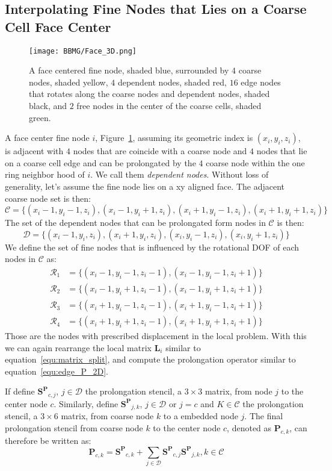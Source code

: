  \subsection{Interpolating Fine Nodes that Lies on a Coarse Cell Face Center}
 \begin{figure}[t]
\texttt{[image: BBMG/Face\_3D.png]}
\centering
\caption{A face centered fine node, shaded blue, surrounded by $4$ coarse nodes, shaded yellow, $4$ dependent nodes, shaded red, $16$ edge nodes that rotates along the coarse nodes and dependent nodes, shaded black, and $2$ free nodes in the center of the coarse cells, shaded green.}
\label{fig:face_center}
\end{figure}
 A face center fine node $i$, Figure~\ref{fig:face_center}, assuming its geometric index is $(x_i,y_i,z_i)$, is adjacent with $4$ nodes that are coincide with a coarse node and $4$ nodes that lie on a coarse cell edge and can be prolongated by the $4$ coarse node within the one ring neighbor hood of $i$. We call them \textit{dependent nodes}. Without loss of generality, let's assume the fine node lies on a xy aligned face. The adjacent coarse node set is then:
 \begin{equation}
 \mathcal{C} = \{(x_i-1,y_i-1,z_i),(x_i-1,y_i+1,z_i),(x_i+1,y_i-1,z_i),(x_i+1,y_i+1,z_i)\}
 \end{equation}
 The set of the dependent nodes that can be prolongated form nodes in $\mathcal{C}$ is then:
  \begin{equation}
 \mathcal{D} = \{(x_i-1,y_i,z_i),(x_i+1,y_i,z_i),(x_i,y_i-1,z_i),(x_i,y_i+1,z_i)\}
 \label{equ:embedding_set}
 \end{equation}
We define the set of fine nodes that is influenced by the rotational DOF of each nodes in $\mathcal{C}$ as:
  \begin{align}
 \mathcal{R}_1 &= \{(x_i-1,y_i-1,z_i-1),(x_i-1,y_i-1,z_i+1)\} \\
 \mathcal{R}_2 &= \{(x_i-1,y_i+1,z_i-1),(x_i-1,y_i+1,z_i+1)\} \\
 \mathcal{R}_3 &= \{(x_i+1,y_i-1,z_i-1),(x_i+1,y_i-1,z_i+1)\} \\
 \mathcal{R}_4 &= \{(x_i+1,y_i+1,z_i-1),(x_i+1,y_i+1,z_i+1)\}
 \end{align}
 Those are the nodes with prescribed displacement in the local problem. With this we can again rearrange the local matrix $\mathbf{L}_i$ similar to equation~\ref{equ:matrix_split}, and compute the prolongation operator similar to equation~\ref{equ:edge_P_2D}.

If define $\mathbf{S^P}_{c,j}$, $j \in \mathcal{D}$ the prolongation stencil, a $3 \times 3$ matrix, from node $j$ to the center node $c$. Similarly, define $\mathbf{S^P}_{j,k}$, $j \in \mathcal{D}$ or $j = c$ and $K \in \mathcal{C}$ the prolongation stencil, a $3 \times 6$ matrix, from coarse node $k$ to a embedded node $j$. The final prolongation stencil from coarse node $k$ to the center node $c$, denoted as $\mathbf{P}_{c,k}$, can therefore be written as:
\begin{equation}
\mathbf{P}_{c,k} = \mathbf{S^P}_{c,k} + \sum_{j \in \mathcal{D}} \mathbf{S^P}_{c,j} \mathbf{S^P}_{j,k}, k \in \mathcal{C}
\end{equation}